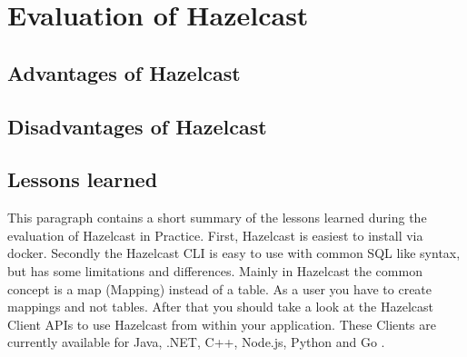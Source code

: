 
\section{Evaluation of Hazelcast}
\todo{}
\subsection{Advantages of Hazelcast}
\todo{}
\subsection{Disadvantages of Hazelcast}
\todo{}
\subsection{Lessons learned}
This paragraph contains a short summary of the lessons learned during the
evaluation of Hazelcast in Practice. First, Hazelcast is easiest to
install via docker. Secondly the Hazelcast CLI is easy to use with common SQL
like syntax, but has some limitations and differences. Mainly in Hazelcast the
common concept is a map (Mapping) instead of a table. As a user you have to
create mappings and not tables. After that you should take a look at the
Hazelcast Client APIs to use Hazelcast from within your application. These
Clients are currently available for Java, .NET, C++, Node.js, Python and Go
\parencite{noauthor_clients_nodate}.